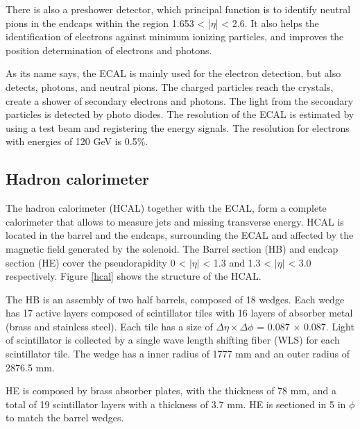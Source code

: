There is also a preshower detector, which principal function is to identify neutral pions in the
endcaps within the region 1.653 < |$\eta$| < 2.6. It also helps the identification of electrons
against minimum ionizing particles, and improves the position determination of electrons and photons.


As its name says, the ECAL is mainly used for the electron detection, but also detects, photons, and neutral pions. The charged particles reach the crystals, create a shower of secondary electrons and photons. The light from the secondary particles is detected by  photo diodes.
The resolution of the ECAL is estimated by using a test beam and registering the energy signals. The resolution for electrons with energies of 120 GeV is 0.5$\%$.
 


\subsection{Hadron calorimeter}
The hadron calorimeter (HCAL) together with the ECAL, form a complete calorimeter that allows to measure jets and missing transverse energy. HCAL is located in the barrel and the endcaps, surrounding the ECAL and affected by the magnetic field generated by the solenoid. The Barrel section (HB) and endcap section (HE) cover the pseudorapidity 0 < $|\eta|$ < 1.3 and 1.3 < $|\eta|$ < 3.0 respectively. Figure \ref{hcal} shows the structure of the HCAL.

The HB is an assembly of two half barrels, composed of 18 wedges. Each wedge has 17 active layers composed of scintillator tiles with 16 layers of absorber metal (brass and stainless steel). Each tile has a size of $\Delta \eta \times \Delta \phi$ = 0.087 $\times$ 0.087. Light of scintillator is collected by a single wave
length shifting fiber (WLS) for each scintillator tile. The wedge has a inner radius of 1777 mm and an outer radius of 2876.5 mm. 

HE is composed by brass absorber plates, with the thickness of 78 mm, and a total of 19 scintillator layers with a thickness of 3.7 mm. HE is sectioned in 5 in $\phi$ to match the barrel wedges.

